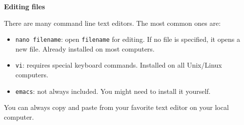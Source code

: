 \documentclass[11pt]{article}
\begin{document}
\textbf{Editing files}

There are many command line text editors. The most common ones are:
\begin{itemize}
\item \texttt{nano filename}: open \texttt{filename} for editing. If no file is specified, it opens a new file. Already installed on most computers.
\item \texttt{vi}: requires special keyboard commands. Installed on all Unix/Linux computers. 
\item \texttt{emacs}: not always included. You might need to install it yourself.
\end{itemize}
You can always copy and paste from your favorite text editor on your local computer.\\
\end{document}
